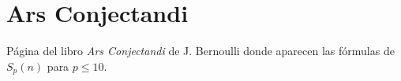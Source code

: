 \chapter{Ars Conjectandi}\label{Ars Conjectandi}

P\'agina del libro \emph{Ars Conjectandi} de J. Bernoulli donde aparecen las f\'ormulas de $S_p(n)$ para $p\leq 10$.

\begin{center}
\end{center} 